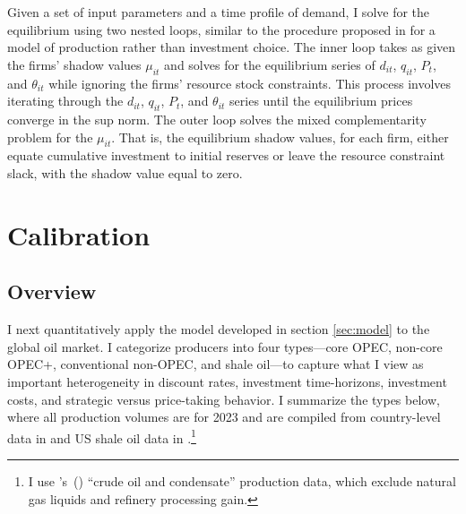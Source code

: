\documentclass[12pt]{article}
\newcommand\cites[1]{\citeauthor{#1}'s\ (\citeyear{#1})}
\begin{document}
Given a set of input parameters and a time profile of demand, I solve for the equilibrium using two nested loops, similar to the procedure proposed in \cite{salant1982} for a model of production rather than investment choice. The inner loop takes as given the firms' shadow values $\mu_{it}$ and solves for the equilibrium series of $d_{it}$, $q_{it}$, $P_t$, and $\theta_{it}$ while ignoring the firms' resource stock constraints. This process involves iterating through the $d_{it}$, $q_{it}$, $P_t$, and $\theta_{it}$ series until the equilibrium prices converge in the sup norm. The outer loop solves the mixed complementarity problem for the $\mu_{it}$. That is, the equilibrium shadow values, for each firm, either equate cumulative investment to initial reserves or leave the resource constraint slack, with the shadow value equal to zero.



\section{Calibration} \label{sec:cal}

\subsection{Overview} \label{sec:cal_over}

I next quantitatively apply the model developed in section \ref{sec:model} to the global oil market. I categorize producers into four types---core OPEC, non-core OPEC+, conventional non-OPEC, and shale oil---to capture what I view as important heterogeneity in discount rates, investment time-horizons, investment costs, and strategic versus price-taking behavior. I summarize the types below, where all production volumes are for 2023 and are compiled from country-level data in \cite{EnergyInstitute2024} and US shale oil data in \cite{EIAtightoil}.\footnote{I use \cites{EnergyInstitute2024} ``crude oil and condensate'' production data, which exclude natural gas liquids and refinery processing gain.}
\end{document}
